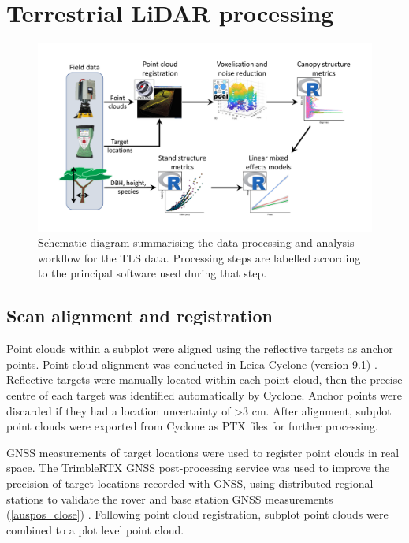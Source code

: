 \documentclass[11pt,a4paper]{article}
\begin{document}
\section{Terrestrial LiDAR processing}


\begin{figure}
\centering
	\includegraphics[width=\linewidth]{workflow_diag}
	\caption{Schematic diagram summarising the data processing and analysis workflow for the TLS data. Processing steps are labelled according to the principal software used during that step.}
	\label{workflow_diag}
\end{figure}

\subsection{Scan alignment and registration}

Point clouds within a subplot were aligned using the reflective targets as anchor points. Point cloud alignment was conducted in Leica Cyclone (version 9.1) \citep{Cyclone}. Reflective targets were manually located within each point cloud, then the precise centre of each target was identified automatically by Cyclone. Anchor points were discarded if they had a location uncertainty of >3 cm. After alignment, subplot point clouds were exported from Cyclone as PTX files for further processing.

GNSS measurements of target locations were used to register point clouds in real space. The TrimbleRTX GNSS post-processing service was used to improve the precision of target locations recorded with GNSS, using distributed regional stations to validate the rover and base station GNSS measurements (\autoref{auspos_close}) \citep{Chen2011}. Following point cloud registration, subplot point clouds were combined to a plot level point cloud.
\end{document}

